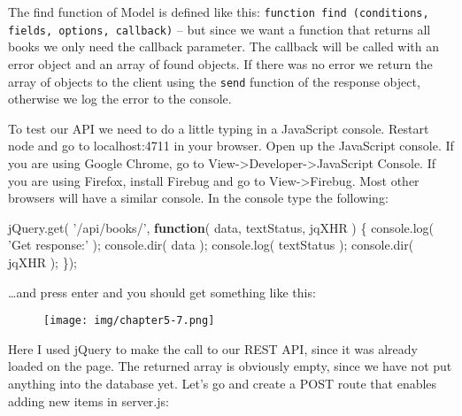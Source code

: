 \documentclass[9pt]{book}
\newenvironment{Shaded}{}{}
\newcommand{\KeywordTok}[1]{\textcolor[rgb]{0.00,0.44,0.13}{\textbf{{#1}}}}
\newcommand{\StringTok}[1]{\textcolor[rgb]{0.25,0.44,0.63}{{#1}}}
\newcommand{\OtherTok}[1]{\textcolor[rgb]{0.00,0.44,0.13}{{#1}}}
\newcommand{\FunctionTok}[1]{\textcolor[rgb]{0.02,0.16,0.49}{{#1}}}
\newcommand{\NormalTok}[1]{{#1}}
\begin{document}
The find function of Model is defined like this:
\texttt{function find (conditions, fields, options, callback)} -- but
since we want a function that returns all books we only need the
callback parameter. The callback will be called with an error object and
an array of found objects. If there was no error we return the array of
objects to the client using the \texttt{send} function of the response
object, otherwise we log the error to the console.

To test our API we need to do a little typing in a JavaScript console.
Restart node and go to localhost:4711 in your browser. Open up the
JavaScript console. If you are using Google Chrome, go to
View-\textgreater{}Developer-\textgreater{}JavaScript Console. If you
are using Firefox, install Firebug and go to View-\textgreater{}Firebug.
Most other browsers will have a similar console. In the console type the
following:

\begin{Shaded}
\begin{Highlighting}[]
\OtherTok{jQuery}\NormalTok{.}\FunctionTok{get}\NormalTok{( }\StringTok{'/api/books/'}\NormalTok{, }\KeywordTok{function}\NormalTok{( data, textStatus, jqXHR ) \{}
    \OtherTok{console}\NormalTok{.}\FunctionTok{log}\NormalTok{( }\StringTok{'Get response:'} \NormalTok{);}
    \OtherTok{console}\NormalTok{.}\FunctionTok{dir}\NormalTok{( data );}
    \OtherTok{console}\NormalTok{.}\FunctionTok{log}\NormalTok{( textStatus );}
    \OtherTok{console}\NormalTok{.}\FunctionTok{dir}\NormalTok{( jqXHR );}
\NormalTok{\});}
\end{Highlighting}
\end{Shaded}

\ldots{}and press enter and you should get something like this:

\begin{figure}[htbp]
\centering
\texttt{[image: img/chapter5-7.png]}
\end{figure}

Here I used jQuery to make the call to our REST API, since it was
already loaded on the page. The returned array is obviously empty, since
we have not put anything into the database yet. Let's go and create a
POST route that enables adding new items in server.js:
\end{document}
